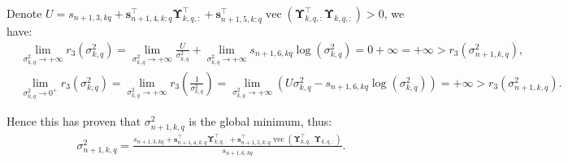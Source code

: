 \documentclass{article}
\DeclareMathOperator*{\vect}{vec} %
\def\vs{{\bm{s}}}
\def\mUpsilon{{\bm{\Upsilon}}}
\begin{document}
Denote $U=s_{n+1,3,kq}+\vs_{n+1,4,k:q}^{\top}\mUpsilon_{k,q,:}^{\top}+\vs_{n+1,5,k:q}^{\top}\vect(\mUpsilon_{k,q,:}^{\top}\mUpsilon_{k,q,:}) >0$, we have:
\begin{align*}
    &\displaystyle\lim_{\sigma_{k,q}^2\rightarrow+\infty}r_3(\sigma_{k,q}^2)=\displaystyle\lim_{\sigma_{k,q}^2\rightarrow+\infty}\frac{U}{\sigma_{k,q}^2}+\displaystyle\lim_{\sigma_{k,q}^2\rightarrow+\infty}s_{n+1,6,kq}\log(\sigma_{k,q}^2)=0 + \infty=+\infty > r_3(\sigma_{n+1,k,q}^{2}),\\
    &\displaystyle\lim_{\sigma_{k,q}^2\rightarrow0^{+}}r_3(\sigma_{k,q}^2)=\displaystyle\lim_{\sigma_{k,q}^2\rightarrow+\infty}r_3(\frac{1}{\sigma_{k,q}^2})=\displaystyle\lim_{\sigma_{k,q}^2\rightarrow+\infty}(U\sigma_{k,q}^2-s_{n+1,6,kq}\log(\sigma_{k,q}^2))=+\infty > r_3(\sigma_{n+1,k,q}^{2}).
\end{align*}
\par Hence this has proven that $\sigma_{n+1,k,q}^{2}$ is the global minimum, thus:
\begin{align*}
    \sigma_{n+1,k,q}^{2}=\frac{s_{n+1,3,kq}+\vs_{n+1,4,k:q}^{\top}\mUpsilon_{k,q,:}^{\top}+\vs_{n+1,5,k:q}^{\top}\vect(\mUpsilon_{k,q,:}^{\top}\mUpsilon_{k,q,:})}{s_{n+1,6,kq}}.
\end{align*}
\end{document}
